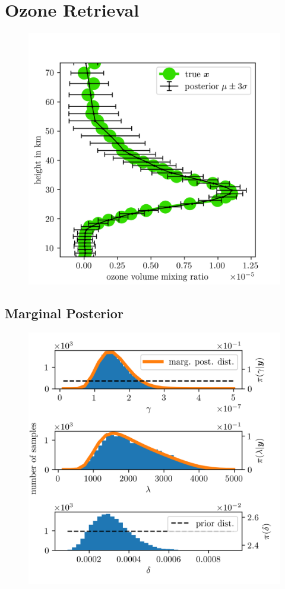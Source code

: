 \section{Ozone Retrieval }
\begin{figure}[ht!]
	\centering
	\includegraphics{secRecRes.png}
	\caption[]{}
	\label{fig:}
\end{figure}

\subsection{Marginal Posterior}
\begin{figure}[ht!]
	\centering
	\includegraphics{secSIRTMargMargO3Res.png}
	\caption[]{}
	\label{fig:}
\end{figure}
